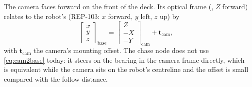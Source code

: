 The camera faces forward on the front of the deck. Its optical frame
(, $Z$ forward) relates to the robot's
 (REP-103: $x$ forward, $y$ left, $z$ up) by
\begin{equation}\label{eq:cam2base}
\begin{bmatrix}x\\y\\z\end{bmatrix}_{\mathrm{base}}
=\begin{bmatrix}Z\\-X\\-Y\end{bmatrix}_{\mathrm{cam}}
+\bm t_{\mathrm{cam}},
\end{equation}
with $\bm t_{\mathrm{cam}}$ the camera's mounting offset. The chase node does
not use \eqref{eq:cam2base} today: it steers on the bearing in the camera
frame directly, which is equivalent while the camera sits on the robot's
centreline and the offset is small compared with the follow distance.
